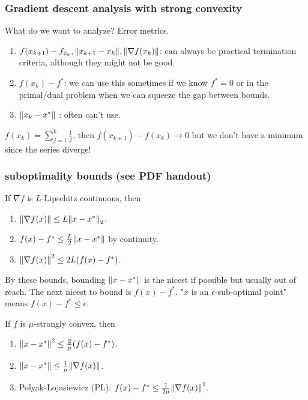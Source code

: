 \documentclass[class=article,crop=false]{standalone}
\begin{document}
\subsubsection{Gradient descent analysis with strong convexity}

What do we want to analyze? Error metrics.

\begin{enumerate}[label=(\arabic*)]
	\item $ f(x_{k+1}) - f_{x_k}, {\left\lVert{ x_{k+1} - x_k}\right\rVert}, {\left\lVert{ \nabla f(x_k)}\right\rVert} $: can always be practical termination criteria, although they might not be good.
	\item $ f(x_k) -f^* $: we can use this sometimes if we know $ f^* =0 $ or in the primal/dual problem when we can squeeze the gap between bounds.
	\item $ {\left\lVert{ x_k - x^* }\right\rVert} $ : often can't use.
\end{enumerate}

\begin{remark}
	$ f(x_k) = \sum_{ j= 1}^{ k} \frac{1}{j}$, then $ f(x_{k+1}) - f(x_k) \to 0$ but we don't have a minimum since the series diverge! 
\end{remark}

\subsubsection{suboptimality bounds (see PDF handout)}
If $ \nabla f$ is $L$-Lipschitz continuous, then 
\begin{enumerate}[label=(\arabic*)]
	\item $ {\left\lVert{ \nabla f(x)}\right\rVert} \leq L {\left\lVert{ x-x^* }\right\rVert}_2  $.
	\item $ f(x) - f^* \leq \frac{L}{2} {\left\lVert{ x - x^* }\right\rVert} $ by continuity.
	\item $ {\left\lVert{ \nabla f(x)}\right\rVert}^2 \leq 2L (f(x) - f^* ) $.
\end{enumerate}
\begin{remark}
	By these bounds, bounding $ {\left\lVert{ x-x^* }\right\rVert} $ is the nicest if possible but usually out of reach. The next nicest to bound is $ f(x) - f^* $. "$ x$ is an $ \epsilon$-sub-optimal point" means $ f(x) - f^* \leq \epsilon$. 
\end{remark}

If $ f$ is  $ \mu$-strongly convex, then
\begin{enumerate}[label=(\arabic*)]
	\item $ {\left\lVert{ x-x^* }\right\rVert}^2 \leq \frac{2}{\mu} (f(x) - f^* ) $.
	\item $ {\left\lVert{ x-x^* }\right\rVert} \leq \frac{1}{\mu} {\left\lVert{ \nabla f(x)}\right\rVert} $.
	\item Polyak-Lojasiewicz (PL): $ f(x) - f^* \leq \frac{1}{2\mu} {\left\lVert{ \nabla f(x)}\right\rVert}^2 $.
\end{enumerate}
\end{document}
